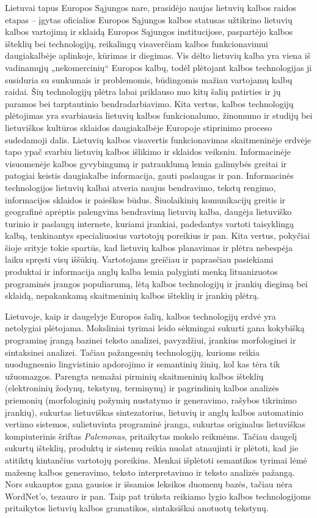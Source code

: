 \begin{multicols}{2}
Lietuvai tapus Europos Sąjungos nare, prasidėjo naujas lietuvių kalbos raidos etapas – įgytas oficialios Europos Sąjungos kalbos statusas užtikrino lietuvių kalbos vartojimą ir sklaidą Europos Sąjungos institucijose, paspartėjo kalbos išteklių bei technologijų, reikalingų visaverčiam kalbos funkcionavimui daugiakalbėje aplinkoje, kūrimas ir diegimas. Vis dėlto lietuvių kalba yra viena iš vadinamųjų „nekomercinių“ Europos kalbų, todėl plėtojant kalbos technologijas ji susiduria su sunkumais ir problemomis, būdingomis mažiau vartojamų kalbų   raidai. Šių technologijų plėtra labai priklauso nuo kitų šalių patirties ir jų paramos bei tarptautinio bendradarbiavimo. Kita vertus, kalbos technologijų plėtojimas yra svarbiausia lietuvių kalbos funkcionalumo, žinomumo ir studijų bei lietuviškos kultūros sklaidos daugiakalbėje Europoje stiprinimo proceso sudedamoji dalis. Lietuvių kalbos visavertis funkcionavimas skaitmeninėje erdvėje tapo ypač svarbiu lietuvių kalbos išlikimo ir sklaidos veiksniu. 
Informacinėje visuomenėje kalbos gyvybingumą ir patrauklumą lemia galimybės greitai ir patogiai keistis daugiakalbe informacija, gauti paslaugas ir pan.  Informacinės technologijos lietuvių kalbai atveria naujus bendravimo, tekstų rengimo, informacijos sklaidos ir paieškos būdus. Šiuolaikinių komunikacijų greitis ir geografinė aprėptis palengvina bendravimą lietuvių kalba, daugėja lietuviško turinio ir paslaugų internete, kuriami įrankiai, padedantys vartoti taisyklingą kalbą, tenkinantys specialiuosius vartotojų poreikius ir pan. Kita vertus, pokyčiai šioje srityje tokie spartūs, kad lietuvių kalbos planavimas ir plėtra nebespėja laiku spręsti visų iššūkių. Vartotojams greičiau ir paprasčiau pasiekiami produktai ir informacija anglų kalba lemia palyginti menką lituanizuotos programinės įrangos populiarumą, lėtą kalbos technologijų ir įrankių diegimą bei sklaidą, nepakankamą skaitmeninių kalbos išteklių ir įrankių plėtrą. 

Lietuvoje, kaip ir daugelyje Europos šalių, kalbos technologijų erdvė yra netolygiai plėtojama. Moksliniai tyrimai leido sėkmingai sukurti gana kokybišką programinę įrangą bazinei teksto analizei, pavyzdžiui, įrankius morfologinei ir sintaksinei analizei. Tačiau pažangesnių technologijų, kurioms reikia nuodugnesnio lingvistinio apdorojimo ir semantinių žinių, kol kas tėra tik užuomazgos. Parengta nemažai pirminių skaitmeninių kalbos išteklių (elektroninių žodynų, tekstynų, terminynų) ir pagrindinių kalbos analizės priemonių (morfologinių požymių nustatymo ir generavimo, rašybos tikrinimo įrankių), sukurtas lietuviškas sintezatorius, lietuvių ir anglų kalbos automatinio vertimo sistemos, sulietuvinta programinė įranga, sukurtas originalus lietuviškas kompiuterinis šriftas \textit{Palemonas}, pritaikytas mokslo reikmėms. Tačiau daugelį sukurtų išteklių, produktų ir sistemų reikia nuolat atnaujinti ir plėtoti, kad jie atitiktų kintančius vartotojų poreikius. Menkai išplėtoti semantikos tyrimai lėmė mažesnę kalbos generavimo, teksto interpretavimo ir teksto analizės pažangą. Nors sukauptos gana gausios ir išsamios leksikos duomenų bazės, tačiau nėra WordNet’o, tezauro ir pan. Taip pat trūksta reikiamo lygio kalbos technologijoms pritaikytos lietuvių kalbos gramatikos, sintaksiškai anotuotų tekstynų.  


\end{multicols}
